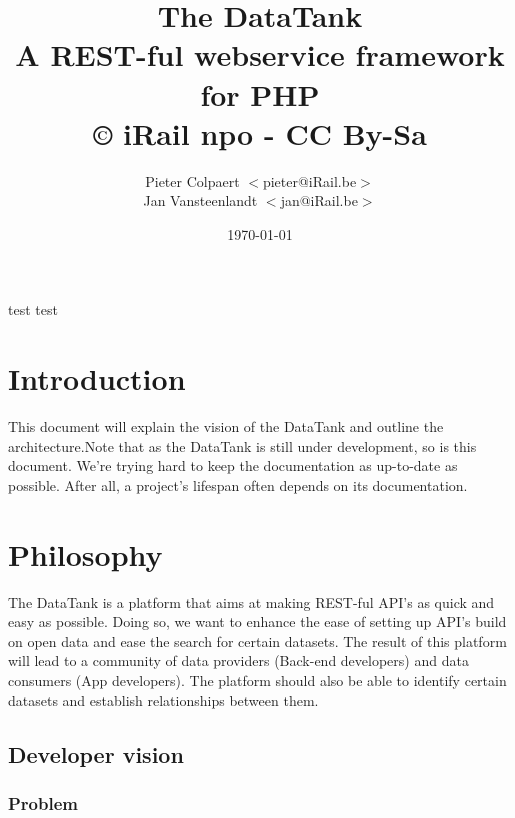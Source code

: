 \documentclass[12pt]{book}
\title{The DataTank\\
           \small A REST-ful webservice framework for PHP\\
                  © iRail npo - CC By-Sa}
\author{
	Pieter Colpaert $<$pieter@iRail.be$>$\\
	Jan Vansteenlandt $<$jan@iRail.be$>$
}
\date{\today}
\begin{document}
\maketitle\setlength{\parindent}{0pt}
\setlength{\parskip}{1ex plus 0.5ex minus 0.2ex}

\thispagestyle{empty}
\tableofcontents


\begin{preface}

test test
\end{preface}



\chapter{Introduction}

This document will explain the vision of the DataTank and outline the architecture.Note that as the DataTank is still under development, so is this document. We're trying hard to keep the documentation as up-to-date as possible. After all, a project's lifespan often depends on its documentation.

\chapter{Philosophy}
The DataTank is a platform that aims at making REST-ful API's as quick and easy as possible. Doing so, we want to enhance the ease of setting up API's build on open data and ease the search for certain datasets. The result of this platform will lead to a community of data providers (Back-end developers) and data consumers (App developers). The platform should also be able to identify certain datasets and establish relationships between them.

\section{Developer vision}
\subsection{Problem}
\end{document}
